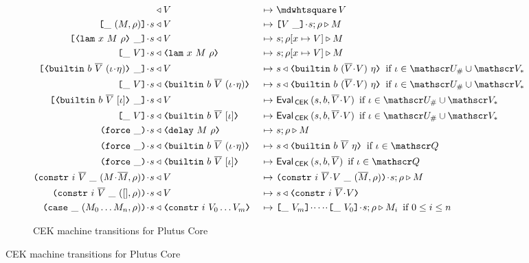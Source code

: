 \begin{figure}[H]
\begin{subfigure}[c]{\linewidth}
\begin{minipage}{\linewidth}
\begin{alignat*}{2}
[] & \return V                                    &~\mapsto~& \cekhalt{V}\\
\inAppLeftFrame{(M,\rho)}  \cons s            & \return V  &~\mapsto~& \inAppRightFrame{V} \cons s;\rho \compute M\\
\inAppRightFrame{\VLamAbs{x}{M}{\rho}} \cons s   & \return V  &~\mapsto~& s;\rho[x \mapsto V] \compute M\\
\inAppLeftFrame{V} \cons s   & \return \VLamAbs{x}{M}{\rho}  &~\mapsto~& s;\rho[x \mapsto V] \compute M\\
\inAppRightFrame{\VBuiltin{b}{\repetition{V}}{(\iota \cons \eta)}} \cons s & \return V &~\mapsto~&
                         s \return \VBuiltin{b}{(\repetition{V} \snoc V)}{\eta} \enskip \text{if $\iota \in \Unihash \cup \Var_*$}\\
\inAppLeftFrame{V} \cons s & \return \VBuiltin{b}{\repetition{V}}{(\iota \cons \eta)} &~\mapsto~&
                         s \return \VBuiltin{b}{(\repetition{V} \snoc V)}{\eta} \enskip \text{if $\iota \in \Unihash \cup \Var_*$}\\
\inAppRightFrame{\VBuiltin{b}{\repetition{V}}{[\iota]}} \cons s  & \return V &~\mapsto~&
                         \EvalCEK\,(s, b, \repetition{V}\snoc V) \enskip \text{if $\iota \in \Unihash \cup \Var_*$}\\
\inAppLeftFrame{V} \cons s & \return \VBuiltin{b}{\repetition{V}}{[\iota]} &~\mapsto~&
                         \EvalCEK\,(s, b, \repetition{V}\snoc V) \enskip \text{if $\iota \in \Unihash \cup \Var_*$}\\
\inForceFrame{} \cons s & \return \VDelay{M}{\rho}         &~\mapsto~& s;\rho \compute M\\
\inForceFrame{} \cons s & \return \VBuiltin{b}{\repetition{V}}{(\iota \cons \eta)} &~\mapsto~&
                         s \return \VBuiltin{b}{\repetition{V}}{\eta} \enskip \text{if $\iota \in \QVar$}\\
\inForceFrame{} \cons s & \return \VBuiltin{b}{\repetition{V}}{[\iota]}   &~\mapsto~&
                         \EvalCEK\,(s, b, \repetition{V}) \enskip \text{if $\iota \in \QVar$}\\
\inConstrFrame{i}{\repetition{V}}{(M \cons \repetition{M}, \rho)} \cons s & \return V   &~\mapsto~&
                         \inConstrFrame{i}{\repetition{V} \cons V}{(\repetition{M}, \rho)} \cons s;\rho \compute M \\
\inConstrFrame{i}{\repetition{V}}{([], \rho)} \cons s & \return V   &~\mapsto~&
                         s \return \VConstr{i}{\repetition{V} \cons V} \\
\inCaseFrame{(M_0 \ldots M_n, \rho)} \cons s & \return \VConstr{i}{V_0 \ldots V_m}   &~\mapsto~&
                         \inAppLeftFrame{V_m} \cons \cdots \cons \inAppLeftFrame{V_0} \cons s ;\rho \compute M_i \enskip \text{if $0 \leq i \leq n$}
\end{alignat*}
\end{minipage}
    \caption{CEK machine transitions for Plutus Core}
    \label{fig:untyped-cek-transitions}
\end{subfigure}


\end{figure}
